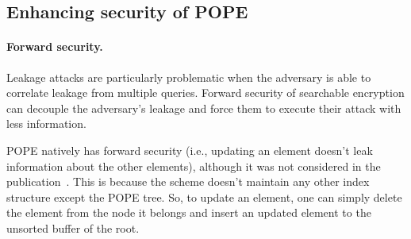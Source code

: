 
\subsection{Enhancing security of POPE}
\iffalse
Many of these defenses are designed to defeat leakage inference attacks.  The first approach is \emph{modularity} in the
sense of modular order-preserving encryption (M-OPE)~\cite{C:BolCheONe11}.  The
idea of M-OPE is to apply a secret random offset modulo the largest possible
message to a message before encrypting it (the secret random offset is chosen
once and fixed in the secret key), so that everything gets ``shifted.''
Since attacks still seem to apply to M-OPE, we propose to investigate more
fine-grained modularity as a defense. 

\paragraph{Random offset for each digit.}
We propose \emph{digit-modular} OPE (DM-OPE) where there is a
secret modular offset applied to each digit.  The base in which the data is
written could even itself be secret.  It becomes more complicated to make range
queries with DM-OPE, as it requires an exponential number of queries in the
number of ``wrap around'' digits in the query.  However, we propose to
investigate approximating the queries efficiently (with some false positives
that the client can filter out).
\fi

\paragraph{Forward security.} Leakage attacks are particularly problematic when
the adversary is able to correlate leakage from multiple queries.  Forward
security of searchable encryption can decouple the adversary's leakage and force
them to execute their attack with less information.  

POPE natively has forward security (i.e., updating an element doesn't leak
information about the other elements), although it was not considered in the
publication~\cite{CCS:RACY16}.  This is because the scheme doesn't maintain any
other index structure except the POPE tree. So, to update an element, one can
simply delete the element from the node it belongs and insert an updated
element to the unsorted buffer of the root. 

